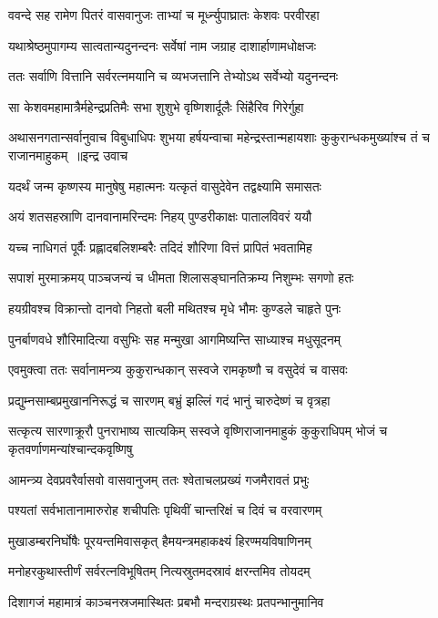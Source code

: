 \twolineshloka
{ववन्दे सह रामेण पितरं वासवानुजः}
{ताभ्यां च मूर्ध्न्युपाघ्रातः केशवः परवीरहा}


\twolineshloka
{यथाश्रेष्ठमुपागम्य सात्वतान्यदुनन्दनः}
{सर्वेषां नाम जग्राह दाशार्हाणामधोक्षजः}


\twolineshloka
{ततः सर्वाणि वित्तानि सर्वरत्नमयानि च}
{व्यभजत्तानि तेभ्योऽथ सर्वेभ्यो यदुनन्दनः}


\twolineshloka
{सा केशवमहामात्रैर्महेन्द्रप्रतिमैः सभा}
{शुशुभे वृष्णिशार्दूलैः सिंहैरिव गिरेर्गुहा}


\fourlineindentedshloka
{अथासनगतान्सर्वानुवाच विबुधाधिपः}
{शुभया हर्षयन्वाचा महेन्द्रस्तान्महायशाः}
{कुकुरान्धकमुख्यांश्च तं च राजानमाहुकम् ॥इन्द्र उवाच}
{}


\twolineshloka
{यदर्थं जन्म कृष्णस्य मानुषेषु महात्मनः}
{यत्कृतं वासुदेवेन तद्वक्ष्यामि समासतः}


\twolineshloka
{अयं शतसहस्राणि दानवानामरिन्दमः}
{निहय् पुण्डरीकाक्षः पातालविवरं ययौ}


\twolineshloka
{यच्च नाधिगतं पूर्वैः प्रह्लादबलिशम्बरैः}
{तदिदं शौरिणा वित्तं प्रापितं भवतामिह}


\twolineshloka
{सपाशं मुरमाक्रमय् पाञ्चजन्यं च धीमता}
{शिलासङ्घानतिक्रम्य निशुम्भः सगणो हतः}


\twolineshloka
{हयग्रीवश्च विक्रान्तो दानवो निहतो बली}
{मथितश्च मृधे भौमः कुण्डले चाहृते पुनः}


\twolineshloka
{पुनर्बाणवधे शौरिमादित्या वसुभिः सह}
{मन्मुखा आगमिष्यन्ति साध्याश्च मधुसूदनम्}


\twolineshloka
{एवमुक्त्वा ततः सर्वानामन्त्र्य कुकुरान्धकान्}
{सस्वजे रामकृष्णौ च वसुदेवं च वासवः}


\twolineshloka
{प्रद्युम्नसाम्बप्रमुखाननिरूद्धं च सारणम्}
{बभ्रुं झल्लिं गदं भानुं चारुदेष्णं च वृत्रहा}


\threelineshloka
{सत्कृत्य सारणाक्रूरौ पुनराभाष्य सात्यकिम्}
{सस्वजे वृष्णिराजानमाहुकं कुकुराधिपम्}
{भोजं च कृतवर्णाणमन्यांश्चान्दकवृष्णिषु}


\twolineshloka
{आमन्त्र्य देवप्रवरैर्वासवो वासवानुजम्}
{ततः श्वेताचलप्रख्यं गजमैरावतं प्रभुः}


\twolineshloka
{पश्यतां सर्वभातानामारुरोह शचीपतिः}
{पृथिवीं चान्तरिक्षं च दिवं च वरवारणम्}


\twolineshloka
{मुखाडम्बरनिर्घोषैः पूरयन्तमिवासकृत्}
{हैमयन्त्रमहाकक्ष्यं हिरण्मयविषाणिनम्}


\twolineshloka
{मनोहरकुथास्तीर्णं सर्वरत्नविभूषितम्}
{नित्यस्रुतमदस्रावं क्षरन्तमिव तोयदम्}


\twolineshloka
{दिशागजं महामात्रं काञ्चनस्रजमास्थितः}
{प्रबभौ मन्दराग्रस्थः प्रतपन्भानुमानिव}


